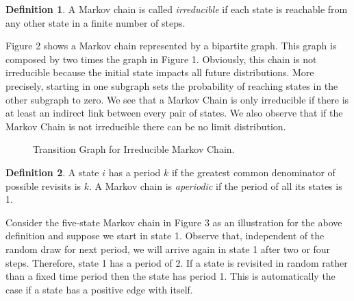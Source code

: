 \documentclass[12pt,english,a4paper,oneside]{article}
\theoremstyle{definition}
\newtheorem{definition}{Definition}[section]
\theoremstyle{definition}
\theoremstyle{definition}
\theoremstyle{definition}
\theoremstyle{remark}
\begin{document}
\begin{definition}
A Markov chain is called \textit{irreducible} if each state is reachable from any other state in a finite number of steps.
\end{definition}

\noindent
Figure 2 shows a Markov chain represented by a bipartite graph. This graph is composed by two times the graph in Figure 1. Obviously, this chain is not irreducible because the initial state impacts all future distributions. More precisely, starting in one subgraph sets the probability of reaching states in the other subgraph to zero. We see that a Markov Chain is only irreducible if there is at least an indirect link between every pair of states. We also observe that if the Markov Chain is not irreducible there can be no limit distribution.

\begin{figure}[H]
\label{fig:ex2}
\centering


\caption{Transition Graph for Irreducible Markov Chain.}

\end{figure}

\begin{definition}
A state $i$ has a period $k$ if the greatest common denominator of possible revisits is $k$. A Markov chain is \textit{aperiodic} if the period of all its states is 1.
\end{definition}

\noindent
Consider the five-state Markov chain in Figure 3 as an illustration for the above definition and suppose we start in state 1. Observe that, independent of the random draw for next period, we will arrive again in state 1 after two or four steps. Therefore, state 1 has a period of 2. If a state is revisited in random rather than a fixed time period then the state has period 1. This is automatically the case if a state has a positive edge with itself.
\end{document}
